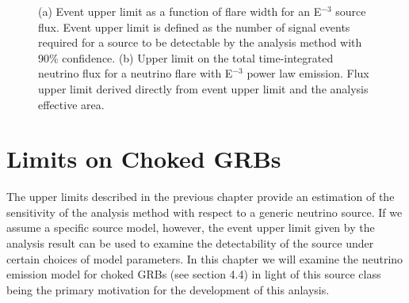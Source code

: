 \documentclass{gatech-thesis}
\begin{document}
\begin{figure}\label{fig:time_int_flux_limit}
\centering
{}
\caption{(a) Event upper limit as a function of flare width for an E$^{-3}$ source flux. Event upper limit is defined as the number of signal events required for a source to be detectable by the analysis method with 90$\%$ confidence. (b) Upper limit on the total time-integrated neutrino flux for a neutrino flare with E$^{-3}$ power law emission. Flux upper limit derived directly from event upper limit and the analysis effective area.} 
\end{figure}


\chapter{Limits on Choked GRBs}
The upper limits described in the previous chapter provide an estimation of the sensitivity of the analysis method with respect to a generic neutrino source. If we assume a specific source model, however, the event upper limit given by the analysis result can be used to examine the detectability of the source under certain choices of model parameters. In this chapter we will examine the neutrino emission model for choked GRBs (see section 4.4) in light of this source class being the primary motivation for the development of this anlaysis.
\end{document}
